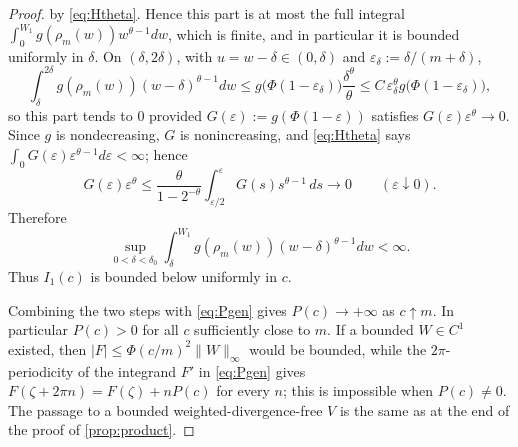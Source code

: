 \documentclass[11pt]{article}
\theoremstyle{definition}
\begin{document}
\begin{proof}
by \eqref{eq:Htheta}.  Hence this part is at most the full integral
$\int_0^{W_1}g(\rho_m(w))w^{\theta-1}dw$, which is finite, and in particular
it is bounded uniformly in $\delta$.  On $(\delta,2\delta)$, with
$u=w-\delta\in(0,\delta)$
and $\varepsilon_\delta:=\delta/(m+\delta)$,
\begin{equation}
\int_\delta^{2\delta}g(\rho_m(w))(w-\delta)^{\theta-1}dw
\le g\bigl(\Phi(1-\varepsilon_\delta)\bigr)\frac{\delta^\theta}{\theta}
\le C\,\varepsilon_\delta^{\theta}g\bigl(\Phi(1-\varepsilon_\delta)\bigr),
\end{equation}
so this part tends to $0$ provided
$G(\varepsilon):=g(\Phi(1-\varepsilon))$ satisfies
$G(\varepsilon)\varepsilon^{\theta}\to0$.  Since $g$ is nondecreasing, $G$ is
nonincreasing, and \eqref{eq:Htheta} says
$\int_0G(\varepsilon)\varepsilon^{\theta-1}d\varepsilon<\infty$; hence
\begin{equation}
G(\varepsilon)\varepsilon^{\theta}
\le\frac{\theta}{1-2^{-\theta}}
\int_{\varepsilon/2}^{\varepsilon}G(s)s^{\theta-1}\,ds
\longrightarrow0
\qquad(\varepsilon\downarrow0).
\end{equation}
Therefore
\begin{equation}
\sup_{0<\delta<\delta_0}
\int_\delta^{W_1}g(\rho_m(w))(w-\delta)^{\theta-1}dw<\infty .
\end{equation}
Thus $I_1(c)$ is bounded below uniformly in $c$.

Combining the two steps with \eqref{eq:Pgen} gives $P(c)\to+\infty$ as
$c\uparrow m$.  In particular $P(c)>0$ for all $c$ sufficiently close to
$m$.  If a bounded $W\in C^1$ existed, then
$|F|\le\Phi(c/m)^2\|W\|_\infty$ would be bounded, while the $2\pi$-periodicity
of the integrand $F'$ in \eqref{eq:Pgen} gives
$F(\zeta+2\pi n)=F(\zeta)+nP(c)$ for every $n$; this is impossible when
$P(c)\neq0$.  The passage to a bounded weighted-divergence-free $V$ is the
same as at the end of the proof of \cref{prop:product}.
\end{proof}
\end{document}
